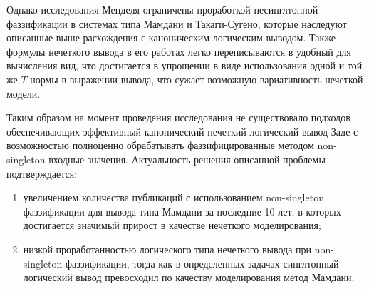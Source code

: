 Однако исследования Менделя ограничены проработкой несинглтонной фаззификации в системах типа Мамдани и Такаги-Сугено, которые наследуют описанные выше расхождения с каноническим логическим выводом. Также формулы нечеткого вывода в его работах легко переписываются в удобный для вычисления вид, что достигается в упрощении в виде использования одной и той же $T$-нормы в выражении вывода, что сужает возможную вариативность нечеткой модели.

Таким образом на момент проведения исследования не существовало подходов обеспечивающих эффективный канонический нечеткий логический вывод Заде с возможностью полноценно обрабатывать фаззифицированные методом non-singleton входные значения. Актуальность решения описанной проблемы подтверждается:
\begin{enumerate}
	\item увеличением количества публикаций с использованием non-singleton фаззификации для вывода типа Мамдани за последние 10 лет, в которых достигается значимый прирост в качестве нечеткого моделирования;
	\item низкой проработанностью логического типа нечеткого вывода при non-singleton фаззификации, тогда как в определенных задачах синглтонный логический вывод превосходил по качеству моделирования метод Мамдани.
\end{enumerate}


%
%
%

